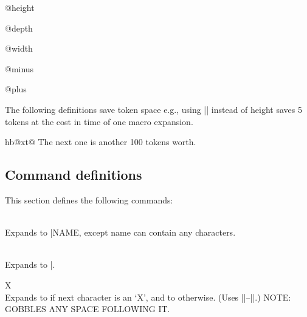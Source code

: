 \begin{docCommand}{@height} { }
\end{docCommand}

\begin{docCommand}{@depth} { }
\end{docCommand}

\begin{docCommand}{@width} { }
\end{docCommand}

\begin{docCommand}{@minus} { }
\end{docCommand}

\begin{docCommand}{@plus} { }
\end{docCommand}



The following definitions save token space  e.g., using
|\@height| instead of height saves 5 tokens at the cost in time
of one macro expansion.
    
\begin{teX}
\def\@height{height} \def\@depth{depth} \def\@width{width}
\def\@minus{minus}
\def\@plus{plus}
\end{teX}
\begin{docCommand}{hb@xt@} { }
The next one is another 100 tokens worth.
\end{docCommand}
\begin{teX}
\def\hb@xt@{\hbox to}
\end{teX}

\begin{teX}
\end{teX}

 \subsection{Command definitions}



 This section defines the following commands:

 \DescribeMacro
  {\@namedef}\\ Expands to |\def\|\marg{NAME},
   except name can contain any characters.

 \DescribeMacro
  {\@nameuse}\\
   Expands to |\|.

 \DescribeMacro
  {\@ifnextchar} X\\
    Expands to  if next character is an `X',
          and to  otherwise.
          (Uses |\reserved@a|--|\reserved@c|.)
          NOTE: GOBBLES ANY SPACE FOLLOWING IT.

